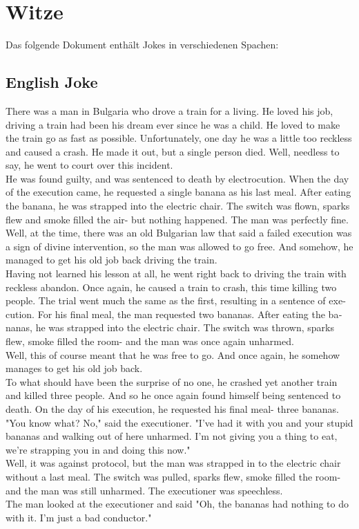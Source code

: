 \documentclass{scrartcl}
\begin{document}
	\section{Witze}
	Das folgende Dokument enthält \textenglish{Jokes} in verschiedenen Spachen:
	\begin{english}
	\subsection{English Joke}
	There was a man in Bulgaria who drove a train for a living.
	He loved his job, driving a train had been his dream ever since he was a child.
	He loved to make the train go as fast as possible.
	Unfortunately, one day he was a little too reckless and caused a crash.
	He made it out, but a single person died.
	Well, needless to say, he went to court over this incident.\\
	He was found guilty, and was sentenced to death by electrocution.
	When the day of the execution came, he requested a single banana as his last meal.
	After eating the banana, he was strapped into the electric chair.
	The switch was flown, sparks flew and smoke filled the air- but nothing happened.
	The man was perfectly fine.\\
	Well, at the time, there was an old Bulgarian law that said a failed execution was a sign of divine intervention, so the man was allowed to go free.
	And somehow, he managed to get his old job back driving the train.\\
	Having not learned his lesson at all, he went right back to driving the train with reckless abandon.
	Once again, he caused a train to crash, this time killing two people.
	The trial went much the same as the first, resulting in a sentence of execution.
	For his final meal, the man requested two bananas.
	After eating the bananas, he was strapped into the electric chair.
	The switch was thrown, sparks flew, smoke filled the room- and the man was once again unharmed.\\
	Well, this of course meant that he was free to go.
	And once again, he somehow manages to get his old job back.\\
	To what should have been the surprise of no one, he crashed yet another train and killed three people.
	And so he once again found himself being sentenced to death.
	On the day of his execution, he requested his final meal- three bananas.
	"You know what? No," said the executioner. "I've had it with you and your stupid bananas and walking out of here unharmed. I'm not giving you a thing to eat, we're strapping you in and doing this now."\\
	Well, it was against protocol, but the man was strapped in to the electric chair without a last meal.
	The switch was pulled, sparks flew, smoke filled the room- and the man was still unharmed.
	The executioner was speechless.\\
	The man looked at the executioner and said "Oh, the bananas had nothing to do with it. I'm just a bad conductor."
	\end{english}
	
\end{document}
